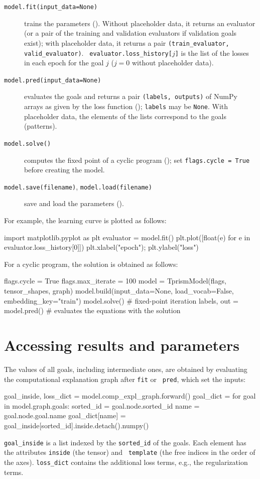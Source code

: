 \documentclass[a4paper]{report}
\begin{document}
\begin{description}
	\item[{\tt model.fit(input\_data=None)}]
	trains the parameters ().  Without
	placeholder data, it returns an evaluator (or a pair of the training and
	validation evaluators if validation goals exist); with placeholder data,
	it returns a pair {\tt (train\_evaluator, valid\_evaluator)}.  {\tt
		evaluator.loss\_history[$j$]} is the list of the losses in each epoch for the
	goal $j$ ($j=0$ without placeholder data).
	\item[{\tt model.pred(input\_data=None)}]
	evaluates the goals and returns a pair {\tt (labels, outputs)} of NumPy
	arrays as given by the loss function ();
	{\tt labels} may be {\tt None}.  With placeholder data, the elements of
	the lists correspond to the goals (patterns).
	\item[{\tt model.solve()}]
	computes the fixed point of a cyclic program (); set {\tt flags.cycle = True} before creating the model.
	\item[{\tt model.save(filename)}, {\tt model.load(filename)}]
	save and load the parameters ().
\end{description}
For example, the learning curve is plotted as follows:
\begin{pythoncode}
import matplotlib.pyplot as plt
evaluator = model.fit()
plt.plot([float(e) for e in evaluator.loss_history[0]])
plt.xlabel("epoch"); plt.ylabel("loss")
\end{pythoncode}
For a cyclic program, the solution is obtained as follows:
\begin{pythoncode}
flags.cycle = True
flags.max_iterate = 100
model = TprismModel(flags, tensor_shapes, graph)
model.build(input_data=None, load_vocab=False, embedding_key="train")
model.solve()              # fixed-point iteration
labels, out = model.pred() # evaluates the equations with the solution
\end{pythoncode}

\section{Accessing results and parameters}
\label{sec:api_result}

The values of all goals, including intermediate ones, are obtained by
evaluating the computational explanation graph after {\tt fit} or {\tt
	pred}, which set the inputs:
\begin{pythoncode}
goal_inside, loss_dict = model.comp_expl_graph.forward()
goal_dict = {}
for goal in model.graph.goals:
    sorted_id = goal.node.sorted_id
    name = goal.node.goal.name
    goal_dict[name] = goal_inside[sorted_id].inside.detach().numpy()
\end{pythoncode}
{\tt goal\_inside} is a list indexed by the {\tt sorted\_id} of the goals.
Each element has the attributes {\tt inside} (the tensor) and {\tt
	template} (the free indices in the order of the axes).  {\tt loss\_dict}
contains the additional loss terms, e.g., the regularization terms.
\end{document}
